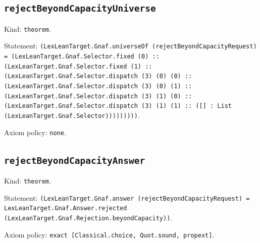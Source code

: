 \documentclass[11pt]{article}
\begin{document}
\subsection*{\texttt{rejectBeyondCapacityUniverse}}
\noindent Kind: \texttt{theorem}.\par
\noindent Statement: \texttt{(LexLeanTarget.Gnaf.universeOf (rejectBeyondCapacityRequest) = (LexLeanTarget.Gnaf.Selector.fixed (0) :: (LexLeanTarget.Gnaf.Selector.fixed (1) :: (LexLeanTarget.Gnaf.Selector.dispatch (3) (0) (0) :: (LexLeanTarget.Gnaf.Selector.dispatch (3) (0) (1) :: (LexLeanTarget.Gnaf.Selector.dispatch (3) (1) (0) :: (LexLeanTarget.Gnaf.Selector.dispatch (3) (1) (1) :: ([] : List (LexLeanTarget.Gnaf.Selector)))))))))}.\par
\noindent Axiom policy: \texttt{none}.\par
\subsection*{\texttt{rejectBeyondCapacityAnswer}}
\noindent Kind: \texttt{theorem}.\par
\noindent Statement: \texttt{(LexLeanTarget.Gnaf.answer (rejectBeyondCapacityRequest) = LexLeanTarget.Gnaf.Answer.rejected (LexLeanTarget.Gnaf.Rejection.beyondCapacity))}.\par
\noindent Axiom policy: \texttt{exact [Classical.choice, Quot.sound, propext]}.\par
\end{document}

